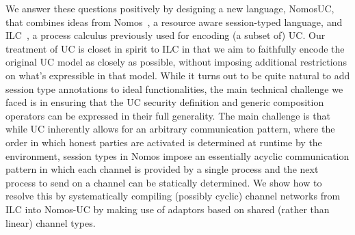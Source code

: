 We answer these questions positively by designing a new language, NomosUC, that combines ideas from
Nomos~\cite{dasnomos}, a resource aware session-typed language, and ILC~\cite{ilc},
a process calculus previously used for encoding (a subset of) UC.
Our treatment of UC is closet in spirit to ILC in that we aim to faithfully encode the original UC model as closely as possible, without imposing additional restrictions on what's expressible in that model.
While it turns out to be quite natural to add session type annotations to ideal functionalities, the main technical challenge we faced is in ensuring that the UC security definition and generic composition operators can be expressed in their full generality.
The main challenge is that while UC inherently allows for an arbitrary communication pattern, where the order in which honest parties are activated is determined at runtime by the environment, session types in Nomos impose an essentially acyclic communication pattern in which each channel is provided by a single process and the next process to send on a channel can be statically determined.
We show how to resolve this by systematically compiling (possibly cyclic) channel networks from ILC into Nomos-UC by making use of adaptors based on shared (rather than linear) channel types.

